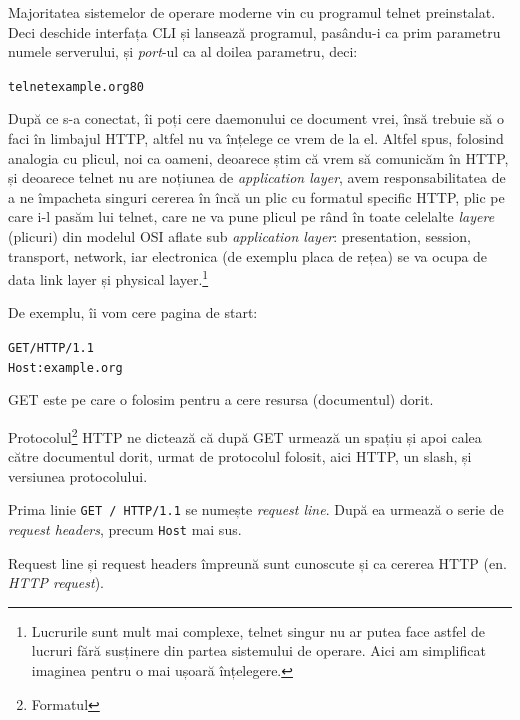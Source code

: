 Majoritatea sistemelor de operare moderne vin cu programul telnet preinstalat.
Deci deschide interfața CLI și lansează programul, pasându-i ca prim parametru numele
serverului, și \textit{port}-ul ca al doilea parametru, deci:
\begin{alltt}
telnet example.org 80
\end{alltt}
După ce s-a conectat, îi poți cere daemonului ce document vrei, însă trebuie
să o faci în limbajul HTTP, altfel nu va {\glqq}înțelege{\grqq} ce vrem de la el.
Altfel spus, folosind analogia cu plicul, noi ca oameni, deoarece
știm că vrem să comunicăm în HTTP, și deoarece telnet nu are noțiunea
de \textit{application layer}, avem responsabilitatea de a ne
{\glqq}împacheta{\grqq} singuri cererea în încă un plic cu formatul specific HTTP,
plic pe care i-l pasăm lui telnet, care ne va pune plicul
pe rând în toate celelalte \textit{layere} ({\glqq}plicuri{\grqq}) din modelul OSI aflate
sub \textit{application layer}: presentation, session, transport, network, iar
electronica (de exemplu placa de rețea) se va ocupa de data link layer și
physical layer.\footnote{Lucrurile sunt mult mai complexe, telnet
singur nu ar putea face astfel de lucruri fără susținere
din partea sistemului de operare. Aici am simplificat imaginea
pentru o mai ușoară înțelegere.}

De exemplu, îi vom cere
pagina de start:
\begin{alltt}
GET / HTTP/1.1\Return
Host: example.org\Return
\Return
\end{alltt}
GET este  pe care o folosim
pentru a cere resursa (documentul) dorit.

Protocolul\footnote{Formatul} HTTP ne dictează că după GET urmează un spațiu
și apoi calea către documentul dorit, urmat de protocolul folosit, aici HTTP, un
slash, și versiunea protocolului.

Prima linie \texttt{GET / HTTP/1.1} se numește \textsl{request line}.
După ea urmează o serie de \textsl{request headers}, precum \texttt{Host} mai sus.

Request line și request headers împreună sunt cunoscute și ca cererea HTTP (en.
\textsl{HTTP request}).
	
